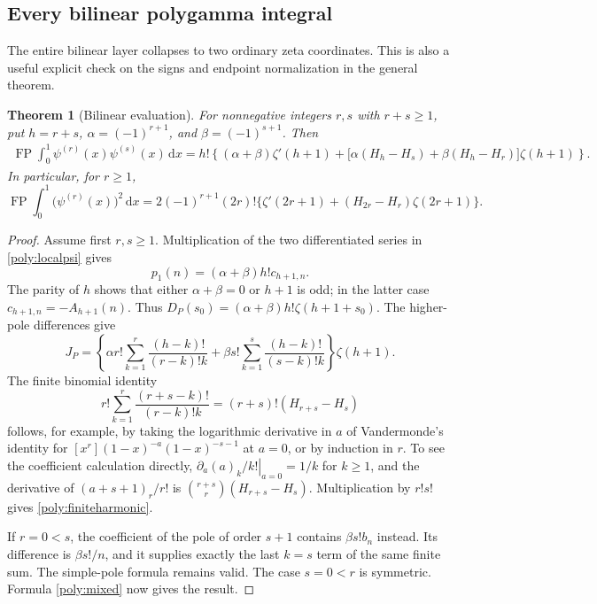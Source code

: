 \documentclass[11pt,a4paper]{article}
\numberwithin{equation}{section}
\newtheorem{theorem}{Theorem}[section]
\theoremstyle{definition}
\theoremstyle{remark}
\DeclareMathOperator{\FP}{FP}
\newcommand{\dd}{\,\mathrm d}
\begin{document}
\subsection{Every bilinear polygamma integral}

The entire bilinear layer collapses to two ordinary zeta coordinates.
This is also a useful explicit check on the signs and endpoint
normalization in the general theorem.

\begin{theorem}[Bilinear evaluation]
\label{poly:bilinear}
For nonnegative integers $r,s$ with $r+s\ge1$, put $h=r+s$,
$\alpha=(-1)^{r+1}$, and $\beta=(-1)^{s+1}$. Then
\begin{align}\label{poly:bilineareq}
 \boxed{\displaystyle
 \FP\int_0^1\psi^{(r)}(x)\psi^{(s)}(x)\dd x
 =h!\left\{(\alpha+\beta)\zeta'(h+1)
 +\bigl[\alpha(H_h-H_s)+\beta(H_h-H_r)\bigr]\zeta(h+1)\right\}.}
\end{align}
In particular, for $r\ge1$,
\begin{equation}\label{poly:square}
 \FP\int_0^1\bigl(\psi^{(r)}(x)\bigr)^2\dd x
 =2(-1)^{r+1}(2r)!
 \{\zeta'(2r+1)+(H_{2r}-H_r)\zeta(2r+1)\}.
\end{equation}
\end{theorem}

\begin{proof}
Assume first $r,s\ge1$. Multiplication of the two differentiated
series in \eqref{poly:localpsi} gives
\[
 p_1(n)=(\alpha+\beta)h!c_{h+1,n}.
\]
The parity of $h$ shows that either $\alpha+\beta=0$ or
$h+1$ is odd; in the latter case $c_{h+1,n}=-A_{h+1}(n)$.
Thus
$D_P(s_0)=(\alpha+\beta)h!\zeta(h+1+s_0)$.
The higher-pole differences give
\[
 J_P=\left\{
 \alpha r!\sum_{k=1}^r\frac{(h-k)!}{(r-k)!k}
 +\beta s!\sum_{k=1}^s\frac{(h-k)!}{(s-k)!k}
 \right\}\zeta(h+1).
\]
The finite binomial identity
\begin{equation}\label{poly:finiteharmonic}
 r!\sum_{k=1}^r\frac{(r+s-k)!}{(r-k)!k}
 =(r+s)!(H_{r+s}-H_s)
\end{equation}
follows, for example, by taking the logarithmic derivative in $a$ of
Vandermonde's identity for $[x^r](1-x)^{-a}(1-x)^{-s-1}$ at
$a=0$, or by induction in $r$. To see the coefficient calculation
directly, $\left.\partial_a(a)_k/k!\right|_{a=0}=1/k$ for $k\ge1$,
and the derivative of $(a+s+1)_r/r!$ is
$\binom{r+s}{r}(H_{r+s}-H_s)$. Multiplication by $r!s!$
gives \eqref{poly:finiteharmonic}.

If $r=0<s$, the coefficient of the pole of order $s+1$ contains
$\beta s!b_n$ instead. Its difference is $\beta s!/n$, and it
supplies exactly the last $k=s$ term of the same finite sum.
The simple-pole formula remains valid. The case $s=0<r$ is symmetric.
Formula \eqref{poly:mixed} now gives the result.
\end{proof}
\end{document}
